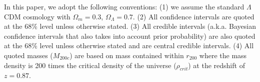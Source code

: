 \par

In this paper, we adopt the following conventions: (1) we
assume the standard $\Lambda$CDM cosmology with $\Omega_{m} = 0.3$, $\Omega_{\Lambda} = 0.7$. (2) All confidence intervals are quoted at the 68\% level unless otherwise stated. 
(3) All credible intervals (a.k.a. Bayesian confidence intervals that also
takes into account prior probability) are also
quoted at the 68\% level unless otherwise stated and are central credible
intervals. (4) All quoted masses ($M_{200c}$) are based on mass contained
within $r_{200}$ where the mass density is 200 times the critical density
of the universe ($\rho_{crit}$) at the redshift of $z = 0.87$. 
